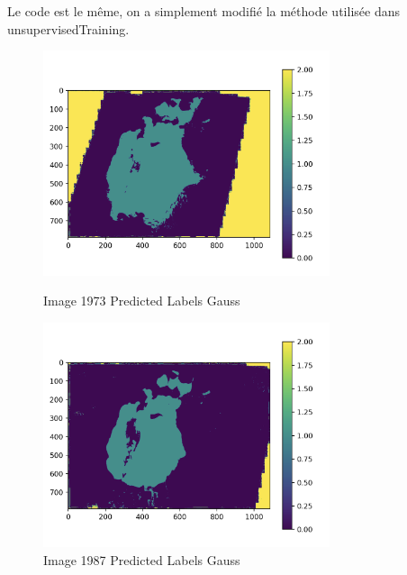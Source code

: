 Le code est le même, on a simplement modifié la méthode utilisée dans unsupervisedTraining.


\begin{figure}[!h]
    \begin{minipage}{.48\linewidth}
        \begin{center}
            \includegraphics[width=0.75\textwidth]{./img/7.2.3.png}
                \caption{\label{fig:6.4.1}Image 1973 Predicted Labels Gauss}  
            \end{center}
    \end{minipage}\hfill
    \begin{minipage}{.48\linewidth}
        \begin{center}
            \includegraphics[width=0.75\textwidth]{./img/7.2.4.png}
            \caption{\label{fig:6.4.2}Image 1987 Predicted Labels Gauss}  
        \end{center}
    \end{minipage}
\end{figure}



















